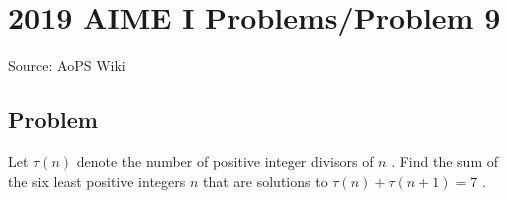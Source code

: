 \documentclass[12pt]{article}
\begin{document}
\section*{{2019 AIME I Problems/Problem 9}}
Source: AoPS Wiki

\subsection*{Problem}
Let $\tau(n)$ denote the number of positive integer divisors of $n$ . Find the sum of the six least positive integers $n$ that are solutions to $\tau (n) + \tau (n+1) = 7$ .
\end{document}
